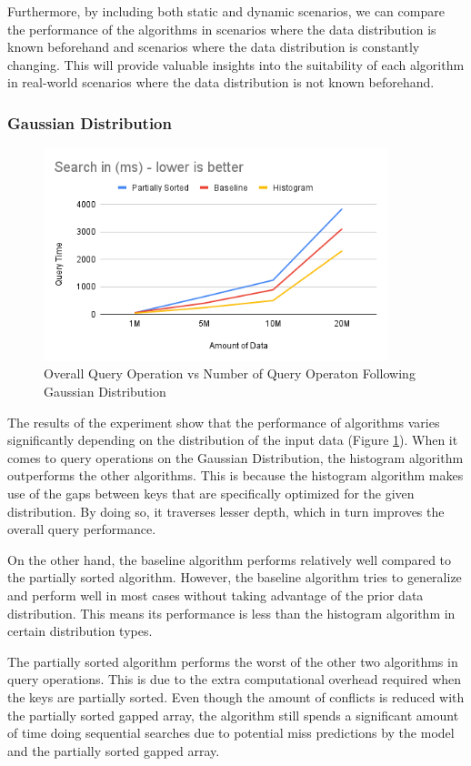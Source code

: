 Furthermore, by including both static and dynamic scenarios, we can compare the performance of the algorithms in scenarios where the data distribution is known beforehand and scenarios where the data distribution is constantly changing. This will provide valuable insights into the suitability of each algorithm in real-world scenarios where the data distribution is not known beforehand.

\subsubsection{Gaussian Distribution}
\begin{figure}[H]
    \centering
    \includegraphics[width=100mm,scale=1]{Figures/QueryGaussian.png}
    \caption{
     Overall Query Operation vs Number of Query Operaton Following Gaussian Distribution
    }
    \label{fig:QueryResultGaussian}
\end{figure}
The results of the experiment show that the performance of \learnindex algorithms varies significantly depending on the distribution of the input data (Figure \ref{fig:QueryResultGaussian}). When it comes to query operations on the Gaussian Distribution, the histogram algorithm outperforms the other algorithms. This is because the histogram algorithm makes use of the gaps between keys that are specifically optimized for the given distribution. By doing so, it traverses lesser depth, which in turn improves the overall query performance.

On the other hand, the baseline algorithm performs relatively well compared to the partially sorted \learnindex algorithm. However, the baseline algorithm tries to generalize and perform well in most cases without taking advantage of the prior data distribution. This means its performance is less than the histogram algorithm in certain distribution types.

The partially sorted algorithm performs the worst of the other two algorithms in query operations. This is due to the extra computational overhead required when the keys are partially sorted. Even though the amount of conflicts is reduced with the partially sorted gapped array, the algorithm still spends a significant amount of time doing sequential searches due to potential miss predictions by the model and the partially sorted gapped array.

